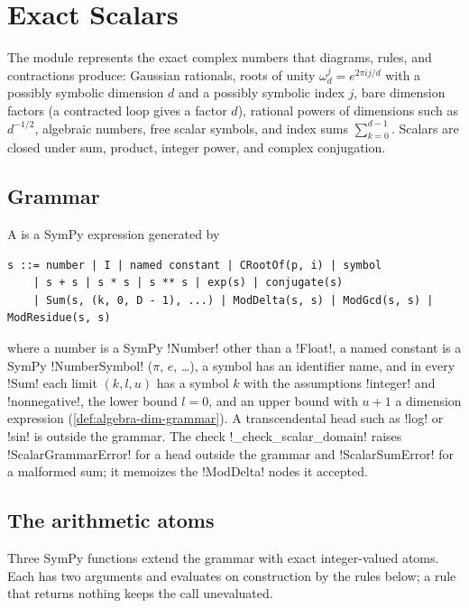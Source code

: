 \section{Exact Scalars}\label{sec:algebra-scalar}

The module  represents the exact complex numbers that diagrams, rules, and contractions produce: Gaussian rationals, roots of unity $\omega_d^j=e^{2\pi i j/d}$ with a possibly symbolic dimension $d$ and a possibly symbolic index $j$, bare dimension factors (a contracted loop gives a factor $d$), rational powers of dimensions such as $d^{-1/2}$, algebraic numbers, free scalar symbols, and index sums $\sum_{k=0}^{d-1}$. Scalars are closed under sum, product, integer power, and complex conjugation.

\subsection{Grammar}

\begin{definition}\label{def:algebra-scalar-grammar}
A  is a SymPy expression generated by
\begin{lstlisting}[style=grammar]
s ::= number | I | named constant | CRootOf(p, i) | symbol
    | s + s | s * s | s ** s | exp(s) | conjugate(s)
    | Sum(s, (k, 0, D - 1), ...) | ModDelta(s, s) | ModGcd(s, s) | ModResidue(s, s)
\end{lstlisting}
where a number is a SymPy \py!Number! other than a \py!Float!, a named constant is a SymPy \py!NumberSymbol! ($\pi$, $e$, \ldots), a symbol has an identifier name, and in every \py!Sum! each limit $(k,l,u)$ has a symbol $k$ with the assumptions \code!integer! and \code!nonnegative!, the lower bound $l=0$, and an upper bound with $u+1$ a dimension expression (\cref{def:algebra-dim-grammar}). A transcendental head such as \py!log! or \py!sin! is outside the grammar. The check \py!_check_scalar_domain! raises \py!ScalarGrammarError! for a head outside the grammar and \py!ScalarSumError! for a malformed sum; it memoizes the \py!ModDelta! nodes it accepted.
\end{definition}

\subsection{The arithmetic atoms}

Three SymPy functions extend the grammar with exact integer-valued atoms. Each has two arguments and evaluates on construction by the rules below; a rule that returns nothing keeps the call unevaluated.

